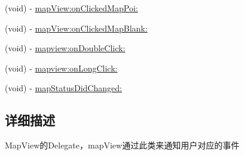 \begin{DoxyCompactItemize}
\item 
(void) -\/ \hyperlink{protocol_b_m_k_map_view_delegate-p_ac3e98436fce2ee14c02837200e57a6fe}{map\+View\+:on\+Clicked\+Map\+Poi\+:}
\item 
(void) -\/ \hyperlink{protocol_b_m_k_map_view_delegate-p_a7e98b75f0edfc05ed93fda98f3fb682e}{map\+View\+:on\+Clicked\+Map\+Blank\+:}
\item 
(void) -\/ \hyperlink{protocol_b_m_k_map_view_delegate-p_a957fb04d2fb88bd0e45ad9d712c1e85f}{mapview\+:on\+Double\+Click\+:}
\item 
(void) -\/ \hyperlink{protocol_b_m_k_map_view_delegate-p_abdef3e78c6a4d51665bc859e16c629a4}{mapview\+:on\+Long\+Click\+:}
\item 
(void) -\/ \hyperlink{protocol_b_m_k_map_view_delegate-p_a06d810eed5ca8add043ab4cd9367f14f}{map\+Status\+Did\+Changed\+:}
\end{DoxyCompactItemize}


\subsection{详细描述}
Map\+View的\+Delegate，map\+View通过此类来通知用户对应的事件 

